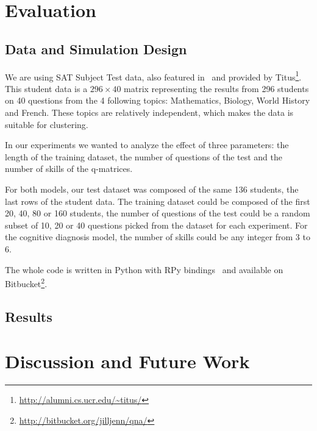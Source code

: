 \documentclass{sig-alternate}
\begin{document}
\section{Evaluation}

\subsection{Data and Simulation Design}

We are using SAT Subject Test data, also featured in~\citep{Winters2005, Desmarais2011} and provided by Titus\footnote{\url{http://alumni.cs.ucr.edu/~titus/}}. This student data is a $296 \times 40$ matrix representing the results from 296 students on 40 questions from the 4 following topics: Mathematics, Biology, World History and French. These topics are relatively independent, which makes the data is suitable for clustering. %

In our experiments we wanted to analyze the effect of three parameters: the length of the training dataset, the number of questions of the test and the number of skills of the q-matrices.

For both models, our test dataset was composed of the same 136 students, the last rows of the student data. The training dataset could be composed of the first 20, 40, 80 or 160 students, the number of questions of the test could be a random subset of 10, 20 or 40 questions picked from the dataset for each experiment. For the cognitive diagnosis model, the number of skills could be any integer from 3 to 6.

The whole code is written in Python with RPy bindings~\citep{Gautier2008} and available on Bitbucket\footnote{\url{http://bitbucket.org/jilljenn/qna/}}.

\subsection{Results}







\section{Discussion and Future Work}
\end{document}
